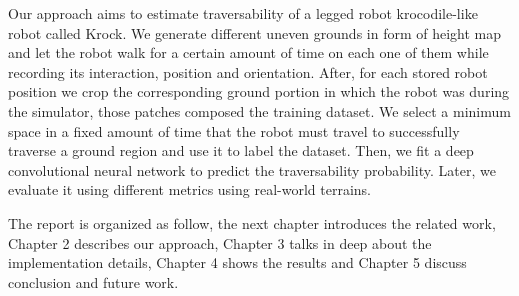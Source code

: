 \documentclass[../document.tex]{subfiles}
\begin{document}
Our approach aims to estimate traversability of a legged robot krocodile-like robot called Krock. We generate different uneven grounds in form of height map and let the robot walk for a certain amount of time on each one of them while recording its interaction, position and orientation. After, for each stored robot position we crop the corresponding ground portion in which the robot was during the simulator, those patches composed the training dataset. We select a minimum space in a fixed amount of time that the robot must travel to successfully traverse a ground region and use it to label the dataset. Then, we fit a deep convolutional neural network to predict the traversability probability. Later, we evaluate it using different metrics using real-world terrains.

The report is organized as follow, the next chapter introduces the related work, Chapter 2 describes our approach, Chapter 3 talks in deep about the implementation details,
Chapter 4 shows the results and Chapter 5 discuss conclusion and future work.
\end{document}
